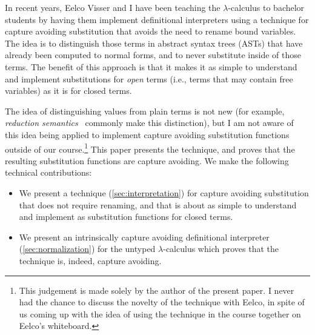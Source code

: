 In recent years, Eelco Visser and I have been teaching the $\lambda$-calculus to bachelor students by having them implement definitional interpreters using a technique for capture avoiding substitution that avoids the need to rename bound variables.
The idea is to distinguish those terms in abstract syntax trees (ASTs) that have already been computed to normal forms, and to never substitute inside of those terms.
The benefit of this approach is that it makes it as simple to understand and implement substitutions for \emph{open} terms (i.e., terms that may contain free variables) as it is for closed terms.

The idea of distinguishing values from plain terms is not new (for example, \emph{reduction semantics}~\citep{FelleisenH92} commonly make this distinction), but I am not aware of this idea being applied to implement capture avoiding substitution functions outside of our course.\footnote{This judgement is made solely by the author of the present paper. I never had the chance to discuss the novelty of the technique with Eelco, in spite of us coming up with the idea of using the technique in the course together on Eelco's whiteboard.}
This paper presents the technique, and proves that the resulting substitution functions are capture avoiding.
We make the following technical contributions:

\begin{itemize}
\item We present a technique (\cref{sec:interpretation}) for capture avoiding substitution that does not require renaming, and that is about as simple to understand and implement as substitution functions for closed terms.
\item We present an intrinsically capture avoiding definitional interpreter (\cref{sec:normalization}) for the untyped $\lambda$-calculus which proves that the technique is, indeed, capture avoiding.
\end{itemize}





